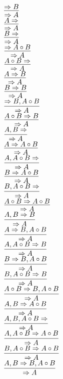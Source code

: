 \documentclass[11pt]{article}
\begin{document}
\begin{center}

$\infer{\Rightarrow A}{\Rightarrow B}$
\bigskip
\\$\infer{\Rightarrow A}{A\Rightarrow }$
\bigskip
\\$\infer{\Rightarrow A}{B\Rightarrow }$
\bigskip
\\$\infer{\Rightarrow A}{\Rightarrow A\circ B}$
\bigskip
\\$\infer{\Rightarrow A}{A\circ B\Rightarrow }$
\bigskip
\\$\infer{\Rightarrow A}{A\Rightarrow B}$
\bigskip
\\$\infer{\Rightarrow A}{B\Rightarrow B}$
\bigskip
\\$\infer{\Rightarrow A}{\Rightarrow B, A\circ B}$
\bigskip
\\$\infer{\Rightarrow A}{A\circ B\Rightarrow B}$
\bigskip
\\$\infer{\Rightarrow A}{A, B\Rightarrow }$
\bigskip
\\$\infer{\Rightarrow A}{A\Rightarrow A\circ B}$
\bigskip
\\$\infer{\Rightarrow A}{A, A\circ B\Rightarrow }$
\bigskip
\\$\infer{\Rightarrow A}{B\Rightarrow A\circ B}$
\bigskip
\\$\infer{\Rightarrow A}{B, A\circ B\Rightarrow }$
\bigskip
\\$\infer{\Rightarrow A}{A\circ B\Rightarrow A\circ B}$
\bigskip
\\$\infer{\Rightarrow A}{A, B\Rightarrow B}$
\bigskip
\\$\infer{\Rightarrow A}{A\Rightarrow B, A\circ B}$
\bigskip
\\$\infer{\Rightarrow A}{A, A\circ B\Rightarrow B}$
\bigskip
\\$\infer{\Rightarrow A}{B\Rightarrow B, A\circ B}$
\bigskip
\\$\infer{\Rightarrow A}{B, A\circ B\Rightarrow B}$
\bigskip
\\$\infer{\Rightarrow A}{A\circ B\Rightarrow B, A\circ B}$
\bigskip
\\$\infer{\Rightarrow A}{A, B\Rightarrow A\circ B}$
\bigskip
\\$\infer{\Rightarrow A}{A, B, A\circ B\Rightarrow }$
\bigskip
\\$\infer{\Rightarrow A}{A, A\circ B\Rightarrow A\circ B}$
\bigskip
\\$\infer{\Rightarrow A}{B, A\circ B\Rightarrow A\circ B}$
\bigskip
\\$\infer{\Rightarrow A}{A, B\Rightarrow B, A\circ B}$

\end{center}
\end{document}
